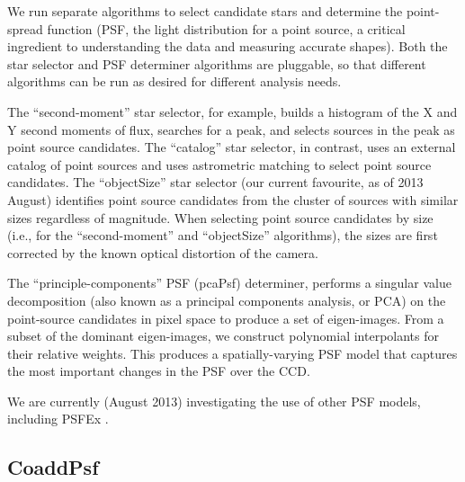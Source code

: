\documentclass[12pt]{article}
\begin{document}
{We run separate algorithms to select candidate stars and determine the point-spread function (PSF, the light
distribution for a point source, a critical ingredient to understanding the data and measuring accurate
shapes).  Both the star selector and PSF determiner algorithms are pluggable, so that different algorithms can
be run as desired for different analysis needs.

The ``second-moment'' star selector, for example, builds a histogram of the X and Y second moments of flux,
searches for a peak, and selects sources in the peak as point source candidates.  The ``catalog'' star
selector, in contrast, uses an external catalog of point sources and uses astrometric matching to select point
source candidates.  The ``objectSize'' star selector (our current favourite, as of 2013 August) identifies
point source candidates from the cluster of sources with similar sizes regardless of magnitude.  When
selecting point source candidates by size (i.e., for the ``second-moment'' and ``objectSize'' algorithms), the
sizes are first corrected by the known optical distortion of the camera.

The ``principle-components'' PSF (pcaPsf) determiner, performs a singular value decomposition (also known as a
principal components analysis, or PCA) on the point-source candidates in pixel space to produce a set of
eigen-images.  From a subset of the dominant eigen-images, we construct polynomial interpolants for their
relative weights.  This produces a spatially-varying PSF model that captures the most important changes in the
PSF over the CCD.

We are currently (August 2013) investigating the use of other PSF models, including PSFEx
\citep{2011ASPC..442..435B}.


\subsection{CoaddPsf}
\label{alg:coaddPsf}


}
\end{document}
